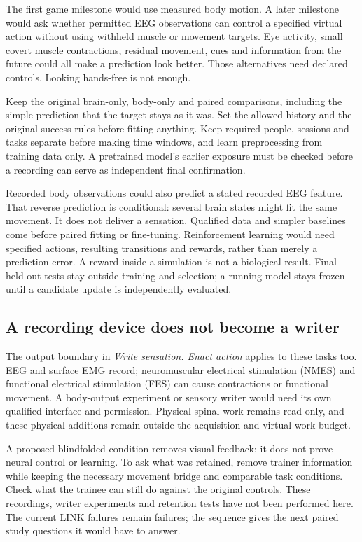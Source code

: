 The first game milestone would use measured body motion. A later milestone would
ask whether permitted EEG observations can control a specified virtual action
without using withheld muscle or movement targets. Eye activity, small covert
muscle contractions, residual movement, cues and information from the future
could all make a prediction look better. Those alternatives need declared
controls. Looking hands-free is not enough.

Keep the original brain-only, body-only and paired comparisons, including the
simple prediction that the target stays as it was. Set the allowed history and
the original success rules before fitting anything. Keep required people,
sessions and tasks separate before making time windows, and learn preprocessing
from training data only. A pretrained model's earlier exposure must be checked
before a recording can serve as independent final confirmation.

Recorded body observations could also predict a stated recorded EEG feature.
That reverse prediction is conditional: several brain states might fit the same
movement. It does not deliver a sensation. Qualified data and simpler baselines
come before paired fitting or fine-tuning. Reinforcement learning would need
specified actions, resulting transitions and rewards, rather than merely a
prediction error. A reward inside a simulation is not a biological result.
Final held-out tests stay outside training and selection; a running model stays
frozen until a candidate update is independently evaluated.

\subsection{A recording device does not become a writer}

The output boundary in \emph{Write sensation. Enact action} applies to these
tasks too. EEG and surface EMG record; neuromuscular electrical stimulation
(NMES) and functional electrical stimulation (FES) can cause contractions or
functional movement. A body-output experiment or sensory writer would need its
own qualified interface and permission. Physical spinal work remains read-only,
and these physical additions remain outside the acquisition and virtual-work
budget.

A proposed blindfolded condition removes visual feedback; it does not prove
neural control or learning. To ask what was retained, remove trainer information
while keeping the necessary movement bridge and comparable task conditions.
Check what the trainee can still do against the original controls. These
recordings, writer experiments and retention tests have not been performed
here. The current LINK failures remain failures; the sequence gives the next
paired study questions it would have to answer.
